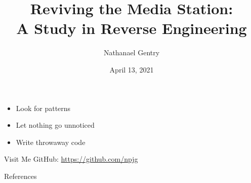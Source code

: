 \documentclass[xcolor=dvipsnames,aspectratio=169,handout,notes]{beamer}
\title{Reviving the Media Station:\\A Study in Reverse Engineering}
\author{Nathanael Gentry}
\institute{Liberty University}
\date{April 13, 2021}
\let\olditem\item
\renewcommand{\item}{\olditem\vspace{8pt}}
\begin{document}
\frame{\titlepage}

\begin{frame}
\begin{itemize}
\item Look for patterns
\item Let nothing go unnoticed
\item Write throwaway code
\end{itemize}
\end{frame}

\begin{frame}{Visit Me}
  GitHub: \url{https://github.com/npjg}
\end{frame}

\begin{frame}[allowframebreaks]{References}
  
  
\end{frame}
\end{document}
